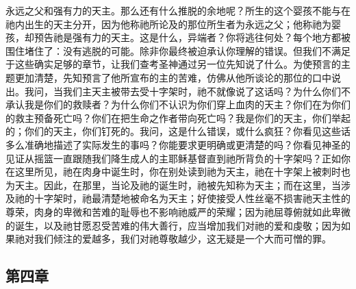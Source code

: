 永远之父和强有力的天主。那么还有什么推脱的余地呢？所生的这个婴孩不能与在祂内出生的天主分开，因为他称祂所论及的那位所生者为永远之父；他称祂为婴孩，却预告祂是强有力的天主。这是什么，异端者？你将逃往何处？每个地方都被围住堵住了：没有逃脱的可能。除非你最终被迫承认你理解的错误。但我们不满足于这些确实足够的章节，让我们查考圣神通过另一位先知说了什么。为使预言的主题更加清楚，先知预言了他所宣布的主的苦难，仿佛从他所谈论的那位的口中说出。我问，当我们主天主被带去受十字架时，祂不就像说了这话吗？为什么你们不承认我是你们的救赎者？为什么你们不认识为你们穿上血肉的天主？你们在为你们的救主预备死亡吗？你们在把生命之作者带向死亡吗？我是你们的天主，你们举起的；你们的天主，你们钉死的。我问，这是什么错误，或什么疯狂？你看见这些话多么准确地描述了实际发生的事吗？你能要求更明确或更清楚的吗？你看见神圣的见证从摇篮一直跟随我们降生成人的主耶稣基督直到祂所背负的十字架吗？正如你在这里所见，祂在肉身中诞生时，你在别处读到祂为天主，祂在十字架上被刺时也为天主。因此，在那里，当论及祂的诞生时，祂被先知称为天主；而在这里，当涉及祂的十字架时，祂最清楚地被命名为天主；好使接受人性丝毫不损害祂天主性的尊荣，肉身的卑微和苦难的耻辱也不影响祂威严的荣耀；因为祂屈尊俯就如此卑微的诞生，以及祂甘愿忍受苦难的伟大善行，应当增加我们对祂的爱和虔敬；因为如果祂对我们倾注的爱越多，我们对祂尊敬越少，这无疑是一个大而可憎的罪。\par


\subsection{第四章}

\par

